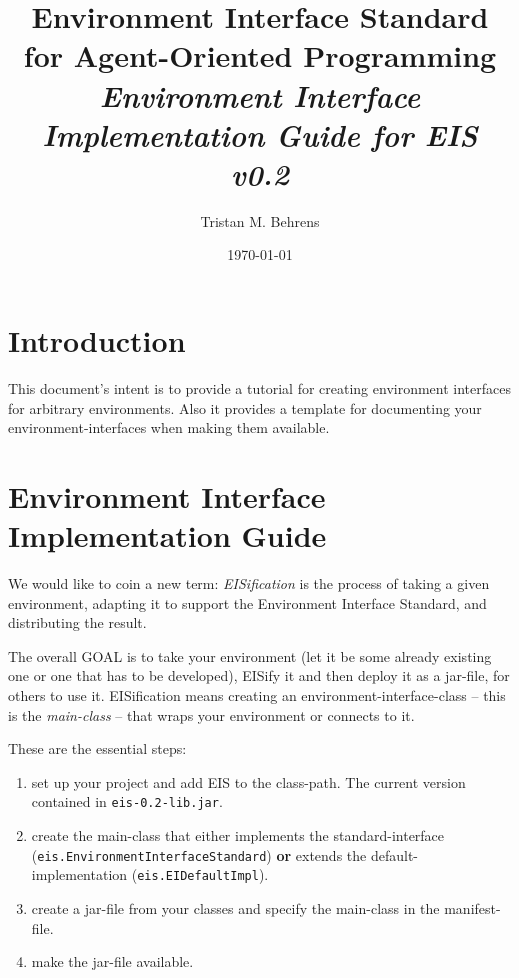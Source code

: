 \documentclass[a4]{article}
\newcommand{\EIS}{\textsf{EIS}\xspace}
\begin{document}
\title{Environment Interface Standard for Agent-Oriented Programming \\
\textit{Environment Interface Implementation Guide for EIS v0.2}
}

\author{Tristan M. Behrens}
\date{\today}

\maketitle

\section{Introduction}

This document's intent is to provide a tutorial for creating environment interfaces for arbitrary environments.
Also it provides a template for documenting your environment-interfaces when making them available.

\section{Environment Interface Implementation Guide}

We would like to coin a new term: \emph{EISification} is the process of taking a given environment, adapting it
to support the Environment Interface Standard, and distributing the result.

The overall GOAL is to take your environment (let it be some already existing one or one that has to be developed),
EISify it and then deploy it as a jar-file, for others to use it. EISification means creating an environment-interface-class
-- this is the \emph{main-class} -- that wraps your environment or connects to it.

These are the essential steps:
\begin{enumerate}
\item set up your project and add \EIS to the class-path. The current version contained in \texttt{eis-0.2-lib.jar}.
\item create the main-class that either implements the standard-interface (\texttt{eis.EnvironmentInterfaceStandard})  
\textbf{or} extends the default-implementation (\texttt{eis.EIDefaultImpl}). 
\item create a jar-file from your classes and specify the main-class in the manifest-file.
\item make the jar-file available.
\end{enumerate}
\end{document}
